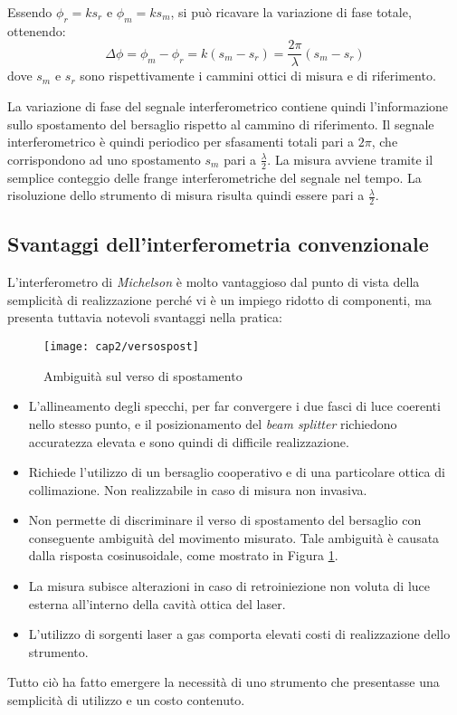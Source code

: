 Essendo $\phi_r= ks_r$ e $\phi_m = ks_m$, si può ricavare la variazione di fase totale, ottenendo:
\begin{equation}
	\Delta \phi=\phi_m-\phi_r=k(s_m-s_r)=\frac{2\pi}{\lambda}(s_m-s_r)
\end{equation}
dove $s_m$ e $s_r$ sono rispettivamente i cammini ottici di misura e di riferimento.

La variazione di fase del segnale interferometrico contiene quindi l'informazione sullo spostamento del bersaglio rispetto al cammino di riferimento. Il segnale interferometrico è quindi periodico per sfasamenti totali pari a $2\pi$, che corrispondono ad uno spostamento $s_m$ pari a $\frac{\lambda}{2}$. La misura avviene tramite il semplice conteggio delle frange interferometriche del segnale nel tempo. La risoluzione dello strumento di misura risulta quindi essere pari a  $\frac{\lambda}{2}$.

\subsection{Svantaggi dell'interferometria convenzionale} 
L'interferometro di \textit{Michelson} è molto vantaggioso dal punto di vista della semplicità di realizzazione perché vi è un impiego ridotto di componenti, ma presenta tuttavia notevoli svantaggi nella pratica:
\begin{figure}  
  \begin{center}
    \texttt{[image: cap2/versospost]}
    \caption{Ambiguità sul verso di spostamento}
    \label{versospost}
  \end{center}
\end{figure}
\begin{itemize}
	\item L'allineamento degli specchi, per far convergere i due fasci di luce coerenti nello stesso punto, e il posizionamento del \textit{beam splitter} richiedono accuratezza elevata e sono quindi di difficile realizzazione.
	\item Richiede l'utilizzo di un bersaglio cooperativo e di una particolare ottica di collimazione. Non realizzabile in caso di misura non invasiva.
	\item Non permette di discriminare il verso di spostamento del bersaglio con conseguente ambiguità del movimento misurato. Tale ambiguità è causata dalla risposta cosinusoidale, come mostrato in Figura \ref{versospost}.
	\item La misura subisce alterazioni in caso di retroiniezione non voluta di luce esterna all'interno della cavità ottica del laser.
	\item L'utilizzo di sorgenti laser a gas comporta elevati costi di realizzazione dello strumento.
\end{itemize}
Tutto ciò ha fatto emergere la necessità di uno strumento che presentasse una semplicità di utilizzo e un costo contenuto.

